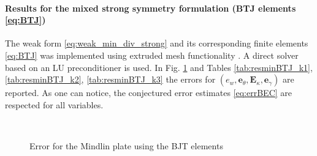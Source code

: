 \paragraph{Results for the mixed strong symmetry formulation (BTJ elements \eqref{eq:BTJ})} 

The weak form \eqref{eq:weak_min_div_strong} and its corresponding finite elements \eqref{eq:BTJ} was implemented using {} extruded mesh functionality \cite{mcrae2016}. A direct solver based on an LU preconditioner is used. In Fig. \ref{fig:errorBTJ} and Tables \ref{tab:resminBTJ_k1}, \ref{tab:resminBTJ_k2}, \ref{tab:resminBTJ_k3} the errors for $(e_w, \bm{e}_\theta, \bm{E}_\kappa, \bm{e}_\gamma)$ are reported. As one can notice, the conjectured error estimates \eqref{eq:errBEC} are respected for all variables. 

\begin{figure}[h!t]%
	\centering
	\hspace{8pt}%
	 \\
	\hspace{8pt}%
	\caption{Error for the Mindlin plate using the BJT elements}%
	\label{fig:errorBTJ}%
\end{figure}


